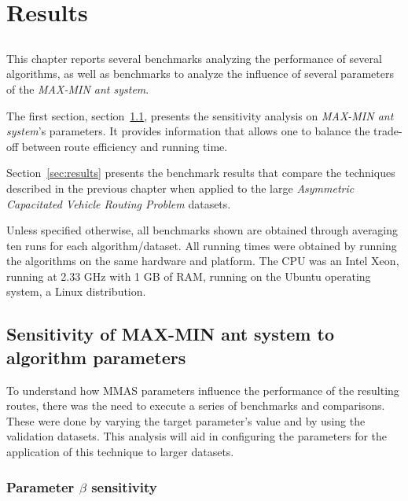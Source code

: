 \chapter{Results}
\label{chap:results}

\section*{}

This chapter reports several benchmarks analyzing the performance of several
algorithms, as well as benchmarks to analyze the influence of several
parameters of the \textit{MAX-MIN ant system}.

The first section, section~\ref{sec:aco}, presents the sensitivity analysis on
\textit{MAX-MIN ant system}'s parameters. It provides information that allows
one to balance the trade-off between route efficiency and running time.

Section~\ref{sec:results} presents the benchmark results that compare the
techniques described in the previous chapter when applied to the large
\textit{Asymmetric Capacitated Vehicle Routing Problem} datasets.

Unless specified otherwise, all benchmarks shown are obtained through averaging
ten runs for each algorithm/dataset. All running times were obtained by running
the algorithms on the same hardware and platform. The CPU was an
Intel\textsuperscript{\textregistered} Xeon\textsuperscript{\textregistered},
running at 2.33 GHz with 1 GB of RAM, running on the Ubuntu operating system, a
Linux distribution.






\section{Sensitivity of MAX-MIN ant system to algorithm parameters}
\label{sec:aco}

To understand how MMAS parameters influence the performance of the resulting
routes, there was the need to execute a series of benchmarks and comparisons.
These were done by varying the target parameter's value and by using the
validation datasets. This analysis will aid in configuring the parameters for
the application of this technique to larger datasets.

\newpage

\subsection{Parameter $\beta$ sensitivity}
\label{section:beta-sensitivity}

